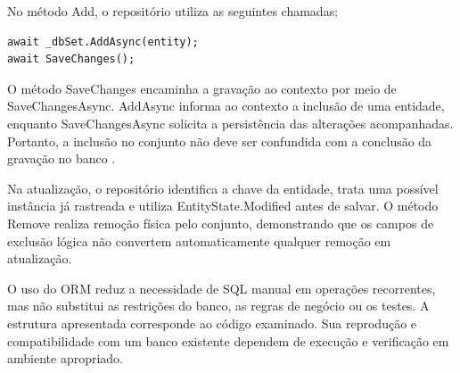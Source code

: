 No método Add, o repositório utiliza as seguintes chamadas:

\begin{verbatim}
await _dbSet.AddAsync(entity);
await SaveChanges();
\end{verbatim}

O método SaveChanges encaminha a gravação ao contexto por meio de SaveChangesAsync. AddAsync informa ao contexto a inclusão de uma entidade, enquanto SaveChangesAsync solicita a persistência das alterações acompanhadas. Portanto, a inclusão no conjunto não deve ser confundida com a conclusão da gravação no banco \parencite{MicrosoftSavingData}.

Na atualização, o repositório identifica a chave da entidade, trata uma possível instância já rastreada e utiliza EntityState.Modified antes de salvar. O método Remove realiza remoção física pelo conjunto, demonstrando que os campos de exclusão lógica não convertem automaticamente qualquer remoção em atualização.

O uso do ORM reduz a necessidade de SQL manual em operações recorrentes, mas não substitui as restrições do banco, as regras de negócio ou os testes. A estrutura apresentada corresponde ao código examinado. Sua reprodução e compatibilidade com um banco existente dependem de execução e verificação em ambiente apropriado.
